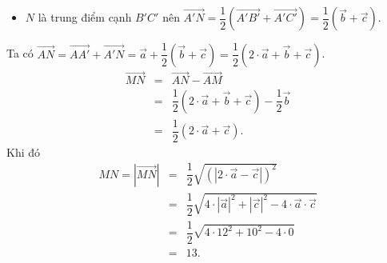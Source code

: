 \begin{ex}
{\begin{itemchoice}
\begin{itemize}
				\item $N$ là trung điểm cạnh $B'C'$ nên $\overrightarrow{A'N}=\dfrac{1}{2}\left(\overrightarrow{A'B'}+\overrightarrow{A'C'}\right)=\dfrac{1}{2}\left(\overrightarrow{b}+\overrightarrow{c}\right)$.
			\end{itemize}
			\itemch Ta có
			$\overrightarrow{AN}=\overrightarrow{AA'}+\overrightarrow{A'N}=\overrightarrow{a}+\dfrac{1}{2}\left(\overrightarrow{b}+\overrightarrow{c}\right)=\dfrac{1}{2}\left(2\cdot\overrightarrow{a}+\overrightarrow{b}+\overrightarrow{c}\right)$.
			\allowdisplaybreaks
			\begin{eqnarray*}
				\overrightarrow{MN}&=&\overrightarrow{AN}-\overrightarrow{AM}\\
				&=&\dfrac{1}{2}\left(2\cdot\overrightarrow{a}+\overrightarrow{b}+\overrightarrow{c}\right)-\dfrac{1}{2}\overrightarrow{b}\\
				&=&\dfrac{1}{2}\left(2\cdot\overrightarrow{a}+\overrightarrow{c}\right).
			\end{eqnarray*}
			Khi đó \allowdisplaybreaks
			\begin{eqnarray*}
				MN=\left|\overrightarrow{MN}\right|&=&\dfrac{1}{2}\sqrt{\left(\left|2\cdot\overrightarrow{a}-\overrightarrow{c}\right|\right)^2}\\
				&=&\dfrac{1}{2}\sqrt{4\cdot\left|\overrightarrow{a}\right|^2+\left|\overrightarrow{c}\right|^2-4\cdot\overrightarrow{a}\cdot\overrightarrow{c}}\\
				&=&\dfrac{1}{2}\sqrt{4\cdot 12^2+10^2-4\cdot 0}\\
				&=&13.
			\end{eqnarray*}
		\end{itemchoice}
	}
\end{ex}

